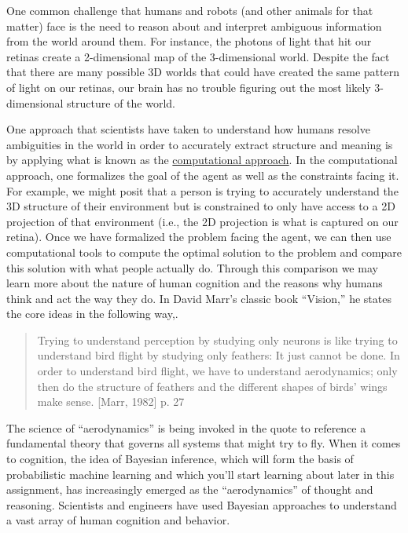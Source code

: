 \documentclass[assignment01_Solutions]{subfiles}
\begin{document}
One common challenge that humans and robots (and other animals for that matter) face is the need to reason about and interpret ambiguous information from the world around them.  For instance, the photons of light that hit our retinas create a 2-dimensional map of the 3-dimensional world.  Despite the fact that there are many possible 3D worlds that could have created the same pattern of light on our retinas, our brain has no trouble figuring out the most likely 3-dimensional structure of the world.

One approach that scientists have taken to understand how humans resolve ambiguities in the world in order to accurately extract structure and meaning is by applying what is known as the \href{https://www.cse.huji.ac.il/~yweiss/intro/node2.html}{computational approach}.  In the computational approach, one formalizes the goal of the agent as well as the constraints facing it.  For example, we might posit that a person is trying to accurately understand the 3D structure of their environment but is constrained to only have access to a 2D projection of that environment (i.e., the 2D projection is what is captured on our retina).  Once we have formalized the problem facing the agent, we can then use computational tools to compute the optimal solution to the problem and compare this solution with what people actually do.  Through this comparison we may learn more about the nature of human cognition and the reasons why humans think and act the way they do.  In David Marr's classic book ``Vision,'' he states the core ideas in the following way,.

\begin{quote}
Trying to understand perception by studying only neurons is like trying to understand bird flight by studying only feathers: It just cannot be done. In order to understand bird flight, we have to understand aerodynamics; only then do the structure of feathers and the different shapes of birds' wings make sense. [Marr, 1982] p. 27
 \end{quote}

The science of ``aerodynamics'' is being invoked in the quote to reference a fundamental theory that governs all systems that might try to fly.  When it comes to cognition, the idea of Bayesian inference, which will form the basis of probabilistic machine learning and which you'll start learning about later in this assignment, has increasingly emerged as the ``aerodynamics'' of thought and reasoning.  Scientists and engineers have used Bayesian approaches to understand a vast array of human cognition and behavior.
\end{document}
